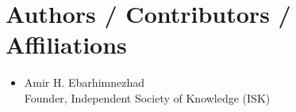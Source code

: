 \section*{Authors / Contributors / Affiliations}
\begin{itemize}
    \item Amir H. Ebarhimnezhad \\
    Founder, Independent Society of Knowledge (ISK)
\end{itemize}

